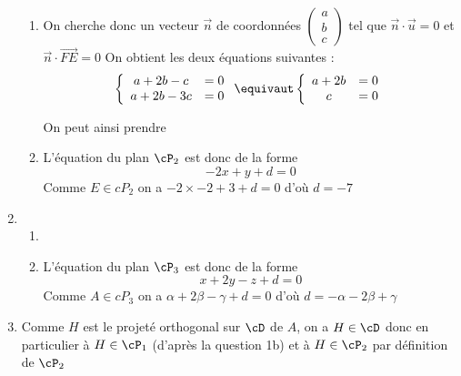 \documentclass[a4paper, 11pt,reqno]{article}
\begin{document}
\begin{correction}
\begin{enumerate}
\begin{enumerate}
\item  On cherche donc un vecteur $\vec{n}$ de coordonnées $\begin{pmatrix}
a\\
b\\
c
\end{pmatrix}$ tel que $\vec{n}\cdot \vec{u}=0$ et $\vec{n} \cdot \vec{FE}=0$
On obtient les deux équations suivantes : 
$$\left\{ \begin{array}{cc}
a+2b-c&=0\\
a+2b-3c&=0
\end{array} \right. \equivaut \left\{ \begin{array}{cc}
a+2b&=0\\
c&=0
\end{array} \right. $$

On peut ainsi prendre 
\item L'équation du plan $\cP_2$ est donc de la forme 
$$-2x+y+d=0$$
Comme $E\in cP_2$ on a $-2\times -2 + 3+d =0$ d'où $d=-7$


\end{enumerate}
\item 
\begin{enumerate}
\item {}
\item L'équation du plan $\cP_3$ est donc de la forme 
$$x+2y-z+d=0$$
Comme $A\in cP_3$ on a $\alpha + 2\beta - \gamma +d =0$ d'où $d=-\alpha -2\beta + \gamma$


\end{enumerate}

\item Comme $H$ est le projeté orthogonal sur $\cD$ de $A$, on a $H\in \cD$ donc en particulier à $H\in \cP_1$ (d'après la question 1b) et  à $H\in \cP_2$ par définition de $\cP_2$ 


\end{enumerate}
\end{correction}
\end{document}

